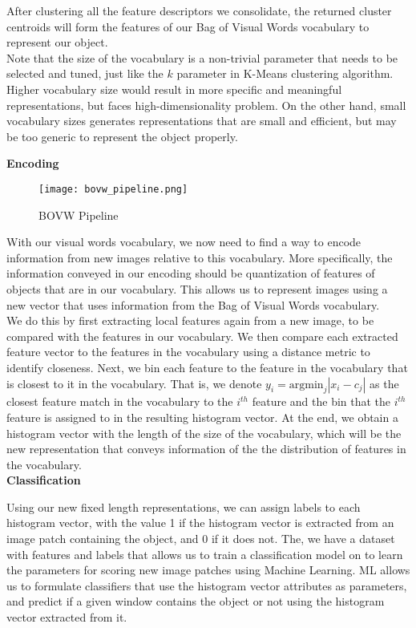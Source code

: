\documentclass[12pt]{article}
\begin{document}
After clustering all the feature descriptors we consolidate, the returned cluster centroids will form the features of our Bag of Visual Words vocabulary to represent our object.\\

Note that the size of the vocabulary is a non-trivial parameter that needs to be selected and tuned, just like the $k$ parameter in K-Means clustering algorithm. Higher vocabulary size would result in more specific and meaningful representations, but faces high-dimensionality problem. On the other hand, small vocabulary sizes generates representations that are small and efficient, but may be too generic to represent the object properly.
\pagebreak

\textbf{Encoding}\\

\begin{figure}[!htb]
\centering
  \texttt{[image: bovw\_pipeline.png]}
  \caption{BOVW Pipeline}
 \label{fig:bovw_pipeline}
\end{figure}

With our visual words vocabulary, we now need to find a way to encode information from new images relative to this vocabulary. More specifically, the information conveyed in our encoding should be quantization of features of objects that are in our vocabulary. This allows us to represent images using a new vector that uses information from the Bag of Visual Words vocabulary.\\

We do this by first extracting local features again from a new image, to be compared with the features in our vocabulary. We then compare each extracted feature vector to the features in the vocabulary using a distance metric to identify closeness. Next, we bin each feature to the feature in the vocabulary that is closest to it in the vocabulary. That is, we denote \textbf{$y_i = \text{argmin}_j |x_i - c_j|$} as the closest feature match in the vocabulary to the $i^{th}$ feature and the bin that the $i^{th}$ feature is assigned to in the resulting histogram vector. At the end, we obtain a histogram vector with the length of the size of the vocabulary, which will be the new representation that conveys information of the the distribution of features in the vocabulary. \\

\textbf{Classification}

Using our new fixed length representations, we can assign labels to each histogram vector, with the value 1 if the histogram vector is extracted from an image patch containing the object, and 0 if it does not. The, we have a dataset with features and labels that allows us to train a classification model on to learn the parameters for scoring new image patches using Machine Learning. ML allows us to formulate classifiers that use the histogram vector attributes as parameters, and predict if a given window contains the object or not using the histogram vector extracted from it.\\
\end{document}
